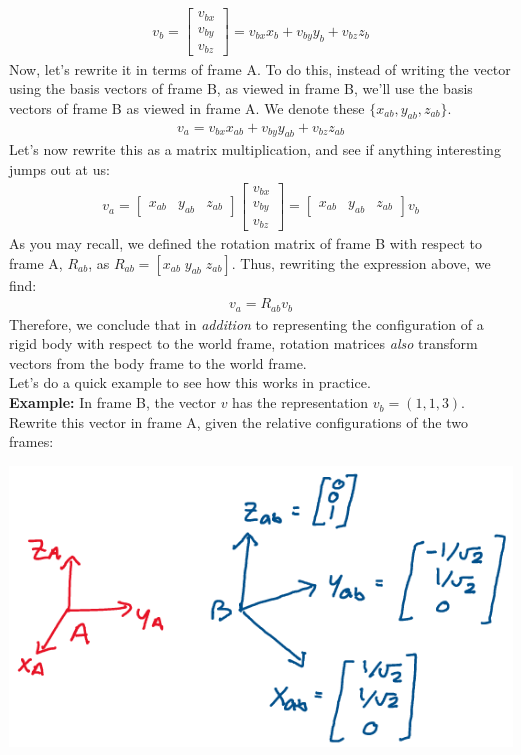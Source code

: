 \documentclass[oneside]{book}
\begin{document}
\begin{align}
    v_b = 
    \begin{bmatrix}
    v_{bx}\\
    v_{by}\\
    v_{bz}
    \end{bmatrix}
     = v_{bx}x_b + v_{by}y_b + v_{bz}z_b
\end{align}
Now, let's rewrite it in terms of frame A. To do this, instead of writing the vector using the basis vectors of frame B, as viewed in frame B, we'll use the basis vectors of frame B as viewed in frame A. We denote these $\{x_{ab}, y_{ab}, z_{ab}\}$.
\begin{align}
    v_a = v_{bx}x_{ab} + v_{by}y_{ab} + v_{bz}z_{ab}
\end{align}
Let's now rewrite this as a matrix multiplication, and see if anything interesting jumps out at us:
\begin{align}
    v_a = \begin{bmatrix}
    x_{ab} & y_{ab} & z_{ab}
    \end{bmatrix}
    \begin{bmatrix}
    v_{bx}\\
    v_{by}\\
    v_{bz}
    \end{bmatrix}
    = \begin{bmatrix}
    x_{ab} & y_{ab} & z_{ab}
    \end{bmatrix} v_b
\end{align}
As you may recall, we defined the rotation matrix of frame B with respect to frame A, $R_{ab}$, as $R_{ab} = [x_{ab} \; y_{ab} \; z_{ab}]$. Thus, rewriting the expression above, we find:
\begin{align}
    v_a = R_{ab}v_b
\end{align}
Therefore, we conclude that in \textit{addition} to representing the configuration of a rigid body with respect to the world frame, rotation matrices \textit{also} transform vectors from the body frame to the world frame.\\
Let's do a quick example to see how this works in practice.\\
\textbf{Example: }In frame B, the vector $v$ has the representation $v_b = (1, 1, 3)$. Rewrite this vector in frame A, given the relative configurations of the two frames:
\begin{center}
\includegraphics[scale=0.3]{images/transformex.png}
\end{center}
\end{document}
